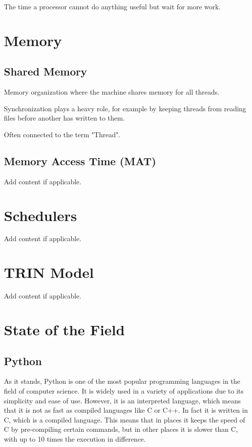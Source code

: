 \documentclass{article}
\begin{document}
The time a processor cannot do anything useful but wait for more work.

\section{Memory}
\subsection{Shared Memory}

Memory organization where the machine shares memory for all threads.

Synchronization plays a heavy role, for example by keeping threads from reading files before another has written to them.

Often connected to the term "Thread".

\subsection{Memory Access Time (MAT)}

Add content if applicable.

\section{Schedulers}

Add content if applicable.

\section{TRIN Model}

Add content if applicable.

\section{State of the Field}
\subsection{Python}

As it stands, Python is one of the most popular programming languages in the field of computer science. It is widely used in a variety of applications due to its simplicity and ease of use. However, it is an interpreted language, which means that it is not as fast as compiled languages like C or C++. In fact it is written in C, which is a compiled language. This means that in places it keeps the speed of C by pre-compiling certain commands, but in other places it is slower than C, with up to 10 times the execution in difference.
\end{document}
